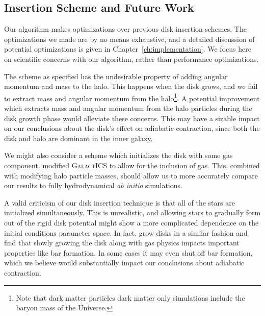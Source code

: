 
\subsection{Insertion Scheme and Future Work} \label{ssec:conclusions_insertion}

Our algorithm makes optimizations over previous disk insertion schemes. The optimizations we made are by no means exhaustive, and a detailed discussion of potential optimizations is given in Chapter~\ref{ch:implementation}. We focus here on scientific concerns with our algorithm, rather than performance optimizations. 

The scheme as specified has the undesirable property of adding angular momentum and mass to the halo. This happens when the disk grows, and we fail to extract mass and angular momentum from the halo\footnote{Note that dark matter particles dark matter only simulations include the baryon mass of the Universe.}. A potential improvement which extracts mass and angular momentum from the halo particles during the disk growth phase would alleviate these concerns. This may have a sizable impact on our conclusions about the disk's effect on adiabatic contraction, since both the disk and halo are dominant in the inner galaxy.

We might also consider a scheme which initializes the disk with some gas component. \citet{deg_2019} modified \textsc{GalactICS} to allow for the inclusion of gas. This, combined with modifying halo particle masses, should allow us to more accurately compare our results to fully hydrodynamical \textit{ab initio} simulations.

A valid criticism of our disk insertion technique is that all of the stars are initialized simultaneously. This is unrealistic, and allowing stars to gradually form out of the rigid disk potential might show a more complicated dependence on the initial conditions parameter space. In fact, \citet{aumer_2016} grow disks in a similar fashion and find that slowly growing the disk along with gas physics impacts important properties like bar formation. In some cases it may even shut off bar formation, which we believe would substantially impact our conclusions about adiabatic contraction.

